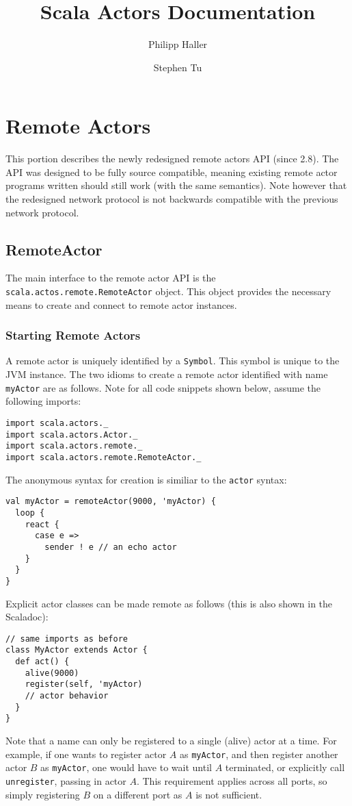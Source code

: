 \documentclass{article}
\title{Scala Actors Documentation}
\author{Philipp Haller \and Stephen Tu}
\begin{document}
\maketitle

\section{Remote Actors}
This portion describes the newly redesigned remote actors API (since 2.8).
The API was designed to be fully source compatible, meaning existing remote
actor programs written should still work (with the same semantics). Note however
that the redesigned network protocol is not backwards compatible with the previous
network protocol.

\subsection{RemoteActor}
The main interface to the remote actor API is the \verb|scala.actos.remote.RemoteActor| object.
This object provides the necessary means to create and connect to remote actor instances.

\subsubsection{Starting Remote Actors}
A remote actor is uniquely identified by a \verb|Symbol|. This symbol is unique to the 
JVM instance. The two idioms to create a remote actor identified with name \verb|myActor|
are as follows. Note for all code snippets shown below, assume the following imports:
\begin{verbatim}
import scala.actors._
import scala.actors.Actor._
import scala.actors.remote._
import scala.actors.remote.RemoteActor._
\end{verbatim}
The anonymous syntax for creation is similiar to the \verb|actor| syntax:
\begin{verbatim}
val myActor = remoteActor(9000, 'myActor) {
  loop {
    react {
      case e => 
        sender ! e // an echo actor
    }
  }
}
\end{verbatim}
Explicit actor classes can be made remote as follows (this is also shown in the Scaladoc):
\begin{verbatim}
// same imports as before
class MyActor extends Actor {
  def act() {
    alive(9000)
    register(self, 'myActor)
    // actor behavior
  }
}
\end{verbatim}
Note that a name can only be registered to a single (alive) actor at a time.
For example, if one wants to register actor $A$ as \verb|myActor|, and then register
another actor $B$ as \verb|myActor|, one would have to wait until $A$ terminated,
or explicitly call \verb|unregister|, passing in actor $A$. This requirement
applies across all ports, so simply registering $B$ on a different port as $A$
is not sufficient.
\end{document}
